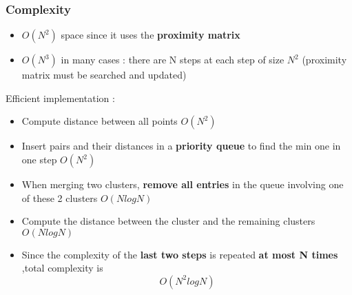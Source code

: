 \subsubsection{Complexity}
\begin{itemize}
\item $O(N^2) $ space since it uses the \textbf{proximity matrix}
\item $O(N^3) $ in many cases : there are N steps at each step of size $N^2$ (proximity matrix must be searched and updated)
\end{itemize}
Efficient implementation :
\begin{itemize}
\item Compute distance between all points $O(N^2)$
\item Insert pairs and their distances in a \textbf{priority queue} to find the min one in one step $O(N^2)$
\item When merging two clusters, \textbf{remove all entries} in the queue involving one of these 2 clusters $O(NlogN)$
\item Compute the distance between the cluster and the remaining clusters $O(NlogN)$
\item Since the complexity of the \textbf{last two steps} is repeated \textbf{at most N times} ,total complexity is $$O(N^2 logN) $$
\end{itemize}


